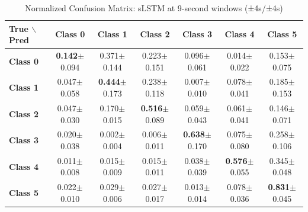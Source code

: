 \begin{table}[htbp]
\centering
\caption{Normalized Confusion Matrix: sLSTM at 9-second windows (±4s/±4s)}
\label{tab:app_cm_slstm_9s}
\small
\setlength{\tabcolsep}{2pt}
\begin{tabular}{lcccccc}
	\toprule
	\textbf{True $\backslash$ Pred} & \textbf{Class 0} & \textbf{Class 1} & \textbf{Class 2} & \textbf{Class 3} & \textbf{Class 4} & \textbf{Class 5} \\
\midrule
	\textbf{Class 0} & \textbf{0.142}$\pm$0.094 & 0.371$\pm$0.144 & 0.223$\pm$0.151 & 0.096$\pm$0.061 & 0.014$\pm$0.022 & 0.153$\pm$0.075 \\
	\textbf{Class 1} & 0.047$\pm$0.058 & \textbf{0.444}$\pm$0.173 & 0.238$\pm$0.118 & 0.007$\pm$0.010 & 0.078$\pm$0.041 & 0.185$\pm$0.153 \\
	\textbf{Class 2} & 0.047$\pm$0.030 & 0.170$\pm$0.015 & \textbf{0.516}$\pm$0.089 & 0.059$\pm$0.043 & 0.061$\pm$0.041 & 0.146$\pm$0.071 \\
	\textbf{Class 3} & 0.020$\pm$0.038 & 0.002$\pm$0.004 & 0.006$\pm$0.011 & \textbf{0.638}$\pm$0.170 & 0.075$\pm$0.080 & 0.258$\pm$0.106 \\
	\textbf{Class 4} & 0.011$\pm$0.008 & 0.015$\pm$0.009 & 0.015$\pm$0.011 & 0.038$\pm$0.039 & \textbf{0.576}$\pm$0.055 & 0.345$\pm$0.048 \\
	\textbf{Class 5} & 0.022$\pm$0.010 & 0.029$\pm$0.006 & 0.027$\pm$0.017 & 0.013$\pm$0.014 & 0.078$\pm$0.036 & \textbf{0.831}$\pm$0.045 \\
\bottomrule
\end{tabular}
\setlength{\tabcolsep}{6pt}
\end{table}

